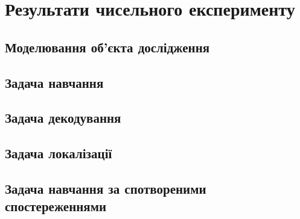 \chapter{Результати чисельного експерименту}
\label{chap: practice}

\section{Моделювання об'єкта дослідження}

\section{Задача навчання}

\section{Задача декодування}

\section{Задача локалізації}

\section{Задача навчання за спотвореними спостереженнями}





